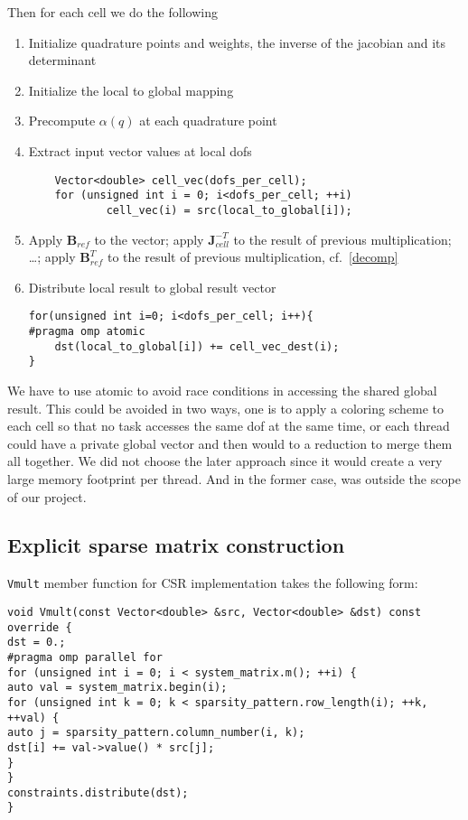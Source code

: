 \documentclass[12pt]{article}
\newcommand{\vect}[1]{\boldsymbol{\mathbf{#1}}}
\begin{document}
Then for each cell we do the following
\begin{enumerate}
\item Initialize quadrature points and weights, the inverse of the jacobian and its determinant
\item Initialize the local to global mapping
\item Precompute $\alpha(q)$ at each quadrature point
\item Extract input vector values at local dofs
\begin{lstlisting}
	Vector<double> cell_vec(dofs_per_cell);
	for (unsigned int i = 0; i<dofs_per_cell; ++i)
			cell_vec(i) = src(local_to_global[i]);
\end{lstlisting}
\item Apply $\vect B_{ref}$ to the vector; apply $\vect J^{-T}_{cell}$ to the result of previous multiplication; \dots ; apply $\vect B^{T}_{ref}$ to the result of previous multiplication, cf.~\eqref{decomp}
\item Distribute local result to global result vector
\begin{lstlisting}
for(unsigned int i=0; i<dofs_per_cell; i++){
#pragma omp atomic
	dst(local_to_global[i]) += cell_vec_dest(i);
}
\end{lstlisting}
\end{enumerate}
We have to use atomic to avoid race conditions in accessing the shared global result. This could be avoided in two ways, one is to apply a coloring scheme to each cell so that no task accesses the same dof at the same time, or each thread could have a private global vector and then would to a reduction to merge them all together. We did not choose the later approach since it would create a very large memory footprint per thread. And in the former case, was outside the scope of our project.

\subsection{Explicit sparse matrix construction}

\texttt{Vmult} member function for CSR implementation takes the following form: 
\begin{lstlisting}[caption={CRS matrix multiplication with row-wise parallelization},captionpos=b]
void Vmult(const Vector<double> &src, Vector<double> &dst) const override {
dst = 0.;
#pragma omp parallel for
for (unsigned int i = 0; i < system_matrix.m(); ++i) {
auto val = system_matrix.begin(i);
for (unsigned int k = 0; k < sparsity_pattern.row_length(i); ++k, ++val) {
auto j = sparsity_pattern.column_number(i, k);
dst[i] += val->value() * src[j];
}
}
constraints.distribute(dst);
}
\end{lstlisting}
\end{document}
